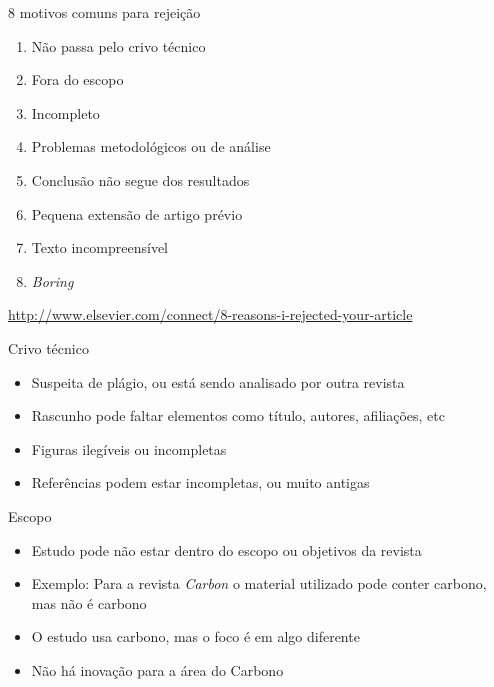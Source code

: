 \documentclass{beamer}
\begin{document}
\begin{frame}{8 motivos comuns para rejeição}
  \begin{enumerate}
    \footnotesize
  \item<1-> Não passa pelo crivo técnico
    \medskip
  \item<1-> Fora do escopo
    \medskip
  \item<1-> Incompleto
    \medskip
  \item<1-> Problemas metodológicos ou de análise
    \medskip
  \item<1-> Conclusão não segue dos resultados
    \medskip
  \item<1-> Pequena extensão de artigo prévio
    \medskip
  \item<1-> Texto incompreensível
    \medskip
  \item<1-> {\em Boring}
  \end{enumerate}

  \vfill
  \tiny
  \hfill \url{http://www.elsevier.com/connect/8-reasons-i-rejected-your-article}
\end{frame}

\begin{frame}{Crivo técnico}
  \begin{itemize}
    \footnotesize
  \item Suspeita de plágio, ou está sendo analisado por outra revista
    \bigskip
  \item Rascunho pode faltar elementos como título, autores,
    afiliações, etc
    \bigskip
  \item Figuras ilegíveis ou incompletas
    \bigskip
  \item Referências podem estar incompletas, ou muito antigas
  \end{itemize}
\end{frame}

\begin{frame}{Escopo}
  \begin{itemize}
    \footnotesize
  \item Estudo pode não estar dentro do escopo ou objetivos da revista
    \bigskip
  \item Exemplo: Para a revista {\em Carbon} o material utilizado pode
    conter carbono, mas não é carbono
    \bigskip
  \item O estudo usa carbono, mas o foco é em algo diferente
    \bigskip
  \item Não há inovação para a área do Carbono
  \end{itemize}
\end{frame}
\end{document}

